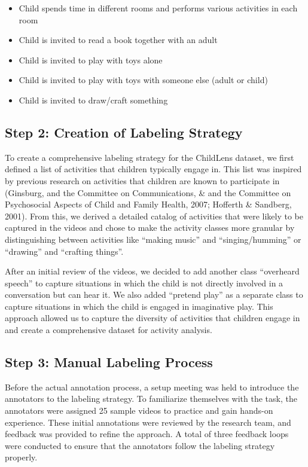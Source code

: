\documentclass[
  man,floatsintext]{apa6}
\providecommand{\tightlist}{%
  \setlength{\itemsep}{0pt}\setlength{\parskip}{0pt}}
\begin{document}
\begin{itemize}
\tightlist
\item
  Child spends time in different rooms and performs various activities in each room
\item
  Child is invited to read a book together with an adult
\item
  Child is invited to play with toys alone
\item
  Child is invited to play with toys with someone else (adult or child)
\item
  Child is invited to draw/craft something
\end{itemize}

\subsection{Step 2: Creation of Labeling Strategy}\label{step-2-creation-of-labeling-strategy}

To create a comprehensive labeling strategy for the ChildLens dataset, we first defined a list of activities that children typically engage in. This list was inspired by previous research on activities that children are known to participate in (Ginsburg, and the Committee on Communications, \& and the Committee on Psychosocial Aspects of Child and Family Health, 2007; Hofferth \& Sandberg, 2001). From this, we derived a detailed catalog of activities that were likely to be captured in the videos and chose to make the activity classes more granular by distinguishing between activities like ``making music'' and ``singing/humming'' or ``drawing'' and ``crafting things''.

After an initial review of the videos, we decided to add another class ``overheard speech'' to capture situations in which the child is not directly involved in a conversation but can hear it. We also added ``pretend play'' as a separate class to capture situations in which the child is engaged in imaginative play. This approach allowed us to capture the diversity of activities that children engage in and create a comprehensive dataset for activity analysis.

\subsection{Step 3: Manual Labeling Process}\label{step-3-manual-labeling-process}

Before the actual annotation process, a setup meeting was held to introduce the annotators to the labeling strategy. To familiarize themselves with the task, the annotators were assigned 25 sample videos to practice and gain hands-on experience. These initial annotations were reviewed by the research team, and feedback was provided to refine the approach. A total of three feedback loops were conducted to ensure that the annotators follow the labeling strategy properly.
\end{document}
